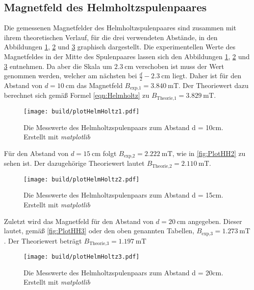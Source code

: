 \subsection{Magnetfeld des Helmholtzspulenpaares}
\label{subsec:A_Helmholtz}
Die gemessenen Magnetfelder des Helmholtzspulenpaares sind zusammen mit ihrem theoretischen Verlauf, für die drei verwendeten Abstände, in den Abbildungen \ref{fig:PlotHH1}, \ref{fig:PlotHH2} und \ref{fig:PlotHH3} 
graphisch dargestellt. Die experimentellen Werte des Magnetfeldes in der Mitte des Spulenpaares lassen sich den Abbildungen \ref{fig:PlotHH1}, \ref{fig:PlotHH2} und \ref{fig:PlotHH3} entnehmen. Da aber die Skala um $2.3\:\unit{\centi\metre}$ verschoben ist muss der Wert
genommen werden, welcher am nächsten bei $\frac{d}{2} - 2.3\:\unit{\centi\metre}$ liegt. Daher ist für den Abstand von $d = 10\:\unit{\centi\metre}$ das Magnetfeld $B_{\text{exp,1}} = 3.840\:\unit{\milli\tesla}$.
Der Theoriewert dazu berechnet sich gemäß Formel \eqref{eqn:Helmholtz} zu $B_{\text{Theorie,1}} = 3.829\:\unit{\milli\tesla}$.
\begin{figure}[H]
    \centering
    \caption{Die Messwerte des Helmholtzspulenpaars zum Abstand d = 10cm. Erstellt mit \textit{matplotlib} \cite{matplotlib}}
    \label{fig:PlotHH1}
    \texttt{[image: build/plotHelmHoltz1.pdf]}
\end{figure}
Für den Abstand von $d = 15\:\unit{\centi\metre}$ folgt $B_{\text{exp,2}} = 2.222\:\unit{\milli\tesla}$, wie in \autoref{fig:PlotHH2} zu sehen ist. Der dazugehörige Theoriewert lautet $B_{\text{Theorie,2}} = 2.110\:\unit{\milli\tesla}$.
\begin{figure}[H]
    \centering
    \caption{Die Messwerte des Helmholtzspulenpaars zum Abstand d = 15cm. Erstellt mit \textit{matplotlib} \cite{matplotlib}}
    \label{fig:PlotHH2}
    \texttt{[image: build/plotHelmHoltz2.pdf]}
\end{figure}
Zuletzt wird das Magnetfeld für den Abstand von $d = 20\:\unit{\centi\metre}$ angegeben. Dieser lautet, gemäß \autoref{fig:PlotHH3} oder den oben genannten Tabellen, $B_{\text{exp,3}} = 1.273\:\unit{\milli\tesla}$. Der Theoriewert beträgt $B_{\text{Theorie,3}} = 1.197\:\unit{\milli\tesla}$
\begin{figure}[H]
    \centering
    \caption{Die Messwerte des Helmholtzspulenpaars zum Abstand d = 20cm. Erstellt mit \textit{matplotlib} \cite{matplotlib}}
    \label{fig:PlotHH3}
    \texttt{[image: build/plotHelmHoltz3.pdf]}
\end{figure}
